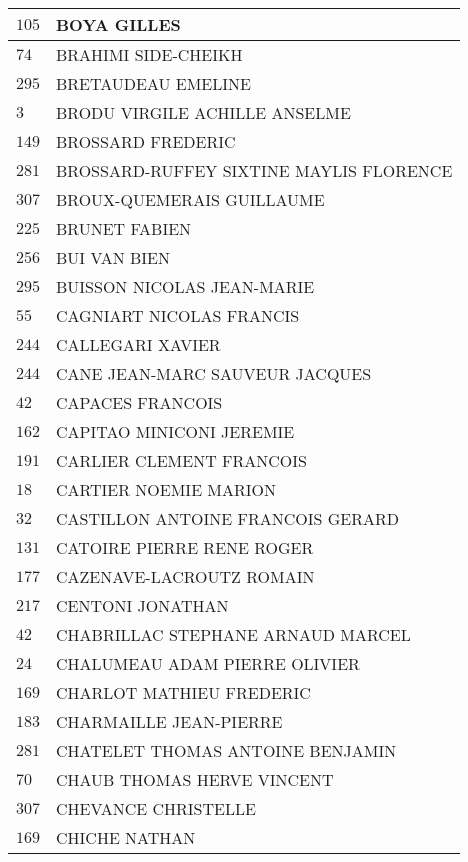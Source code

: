 \begin{xltabular}{\linewidth}{|l|X|}
    \hline
    $105$ & BOYA GILLES \\
    \hline
    $74$ & BRAHIMI SIDE-CHEIKH \\
    \hline
    $295$ & BRETAUDEAU EMELINE \\
    \hline
    $3$ & BRODU VIRGILE ACHILLE ANSELME \\
    \hline
    $149$ & BROSSARD FREDERIC \\
    \hline
    $281$ & BROSSARD-RUFFEY SIXTINE MAYLIS FLORENCE \\
    \hline
    $307$ & BROUX-QUEMERAIS GUILLAUME \\
    \hline
    $225$ & BRUNET FABIEN \\
    \hline
    $256$ & BUI VAN BIEN \\
    \hline
    $295$ & BUISSON NICOLAS JEAN-MARIE \\
    \hline
    $55$ & CAGNIART NICOLAS FRANCIS \\
    \hline
    $244$ & CALLEGARI XAVIER \\
    \hline
    $244$ & CANE JEAN-MARC SAUVEUR JACQUES \\
    \hline
    $42$ & CAPACES FRANCOIS \\
    \hline
    $162$ & CAPITAO MINICONI JEREMIE \\
    \hline
    $191$ & CARLIER CLEMENT FRANCOIS \\
    \hline
    $18$ & CARTIER NOEMIE MARION \\
    \hline
    $32$ & CASTILLON ANTOINE FRANCOIS GERARD \\
    \hline
    $131$ & CATOIRE PIERRE RENE ROGER \\
    \hline
    $177$ & CAZENAVE-LACROUTZ ROMAIN \\
    \hline
    $217$ & CENTONI JONATHAN \\
    \hline
    $42$ & CHABRILLAC STEPHANE ARNAUD MARCEL \\
    \hline
    $24$ & CHALUMEAU ADAM PIERRE OLIVIER \\
    \hline
    $169$ & CHARLOT MATHIEU FREDERIC \\
    \hline
    $183$ & CHARMAILLE JEAN-PIERRE \\
    \hline
    $281$ & CHATELET THOMAS ANTOINE BENJAMIN \\
    \hline
    $70$ & CHAUB THOMAS HERVE VINCENT \\
    \hline
    $307$ & CHEVANCE CHRISTELLE \\
    \hline
    $169$ & CHICHE NATHAN \\
    \hline

\end{xltabular}
